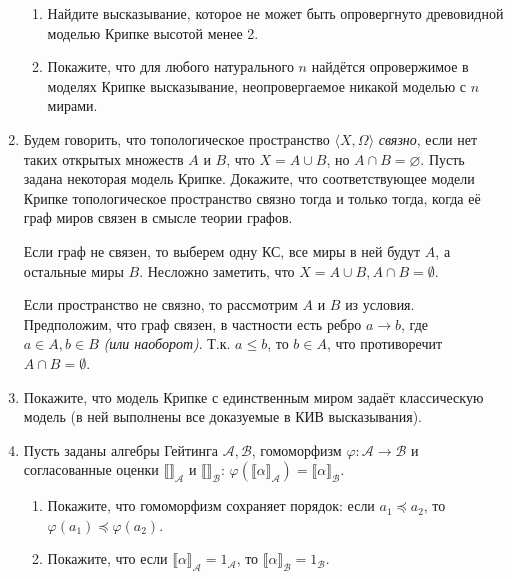 \begin{enumerate}[wide, labelwidth=!, labelindent=0pt]
\begin{enumerate}
                  \item Найдите высказывание, которое не может быть опровергнуто древовидной моделью Крипке
                        высотой менее 2.
                  \item Покажите, что для любого натурального $n$ найдётся опровержимое в моделях Крипке высказывание,
                        неопровергаемое никакой моделью с $n$ мирами.
            \end{enumerate}

      \item Будем говорить, что топологическое пространство $\langle X, \Omega\rangle$ \emph{связно}, если нет таких
            открытых множеств $A$ и $B$, что $X = A \cup B$, но $A \cap B = \varnothing$. Пусть задана некоторая модель Крипке.
            Докажите, что соответствующее модели Крипке топологическое пространство связно тогда и только тогда, когда её граф
            миров связен в смысле теории графов.

            Если граф не связен, то выберем одну КС, все миры в ней будут \(A\), а остальные миры \(B\). Несложно заметить, что \(X = A\cup B, A\cap B = \emptyset\).

            Если пространство не связно, то рассмотрим \(A\) и \(B\) из условия. Предположим, что граф связен, в частности есть ребро \(a \to b\), где \(a\in A, b\in B\) \textit{(или наоборот)}. Т.к. \(a \leq b\), то \(b\in A\), что противоречит \(A\cap B =\emptyset\).

      \item Покажите, что модель Крипке с единственным миром задаёт классическую модель (в ней выполнены
            все доказуемые в КИВ высказывания).

      \item Пусть заданы алгебры Гейтинга $\mathcal{A},\mathcal{B}$, гомоморфизм $\varphi: \mathcal{A} \rightarrow \mathcal{B}$
            и согласованные оценки $\llbracket\rrbracket_\mathcal{A}$ и $\llbracket\rrbracket_\mathcal{B}$:
            $\varphi(\llbracket\alpha\rrbracket_\mathcal{A}) = \llbracket\alpha\rrbracket_\mathcal{B}$.
            \begin{enumerate}
                  \item Покажите, что гомоморфизм сохраняет порядок: если $a_1\preceq a_2$, то $\varphi(a_1) \preceq \varphi(a_2)$.
                  \item Покажите, что если $\llbracket \alpha \rrbracket_\mathcal{A} = 1_\mathcal{A}$, то $\llbracket\alpha\rrbracket_\mathcal{B} = 1_\mathcal{B}$.


\end{enumerate}
\end{enumerate}

